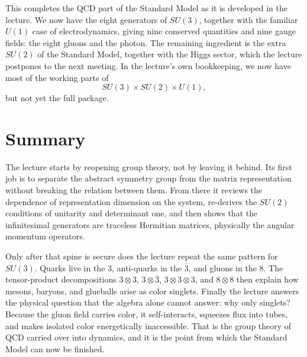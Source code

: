This completes the QCD part of the Standard Model as it is developed in the lecture. We now have the eight generators of \(SU(3)\), together with the familiar \(U(1)\) case of electrodynamics, giving nine conserved quantities and nine gauge fields: the eight gluons and the photon. The remaining ingredient is the extra \(SU(2)\) of the Standard Model, together with the Higgs sector, which the lecture postpones to the next meeting. In the lecture's own bookkeeping, we now have most of the working parts of
\begin{equation}
SU(3)\times SU(2)\times U(1),
\end{equation}
but not yet the full package.

\section{Summary}

The lecture starts by reopening group theory, not by leaving it behind. Its first job is to separate the abstract symmetry group from the matrix representation without breaking the relation between them. From there it reviews the dependence of representation dimension on the system, re-derives the \(SU(2)\) conditions of unitarity and determinant one, and then shows that the infinitesimal generators are traceless Hermitian matrices, physically the angular momentum operators.

Only after that spine is secure does the lecture repeat the same pattern for \(SU(3)\). Quarks live in the \(3\), anti-quarks in the \(\bar 3\), and gluons in the \(8\). The tensor-product decompositions \(3\otimes3\), \(3\otimes\bar 3\), \(3\otimes3\otimes3\), and \(8\otimes8\) then explain how mesons, baryons, and glueballs arise as color singlets. Finally the lecture answers the physical question that the algebra alone cannot answer: why only singlets? Because the gluon field carries color, it self-interacts, squeezes flux into tubes, and makes isolated color energetically inaccessible. That is the group theory of QCD carried over into dynamics, and it is the point from which the Standard Model can now be finished.